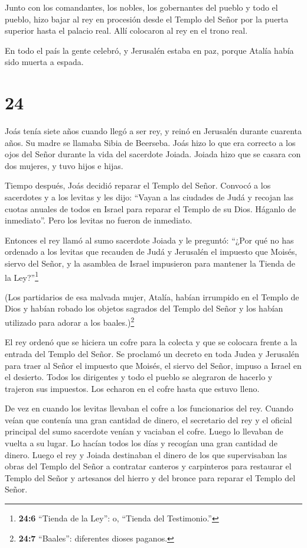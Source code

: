  Junto con los comandantes, los nobles, los gobernantes del
pueblo y todo el pueblo, hizo bajar al rey en procesión desde el Templo
del Señor por la puerta superior hasta el palacio real. Allí colocaron
al rey en el trono real.

 En todo el país la gente celebró, y Jerusalén estaba en
paz, porque Atalía había sido muerta a espada.

\hypertarget{section-23}{%
\section{24}\label{section-23}}

 Joás tenía siete años cuando llegó a ser rey, y reinó en
Jerusalén durante cuarenta años. Su madre se llamaba Sibia de Beerseba.
 Joás hizo lo que era correcto a los ojos del Señor durante
la vida del sacerdote Joiada.  Joiada hizo que se casara con
dos mujeres, y tuvo hijos e hijas.

 Tiempo después, Joás decidió reparar el Templo del Señor.
 Convocó a los sacerdotes y a los levitas y les dijo:
``Vayan a las ciudades de Judá y recojan las cuotas anuales de todos en
Israel para reparar el Templo de su Dios. Háganlo de inmediato''. Pero
los levitas no fueron de inmediato.

 Entonces el rey llamó al sumo sacerdote Joiada y le
preguntó: ``¿Por qué no has ordenado a los levitas que recauden de Judá
y Jerusalén el impuesto que Moisés, siervo del Señor, y la asamblea de
Israel impusieron para mantener la Tienda de la Ley?''\footnote{\textbf{24:6}
  ``Tienda de la Ley'': o, ``Tienda del Testimonio.''}

 (Los partidarios de esa malvada mujer, Atalía, habían
irrumpido en el Templo de Dios y habían robado los objetos sagrados del
Templo del Señor y los habían utilizado para adorar a los
baales.)\footnote{\textbf{24:7} ``Baales'': diferentes dioses paganos.}

 El rey ordenó que se hiciera un cofre para la colecta y que
se colocara frente a la entrada del Templo del Señor.  Se
proclamó un decreto en toda Judea y Jerusalén para traer al Señor el
impuesto que Moisés, el siervo del Señor, impuso a Israel en el
desierto.  Todos los dirigentes y todo el pueblo se
alegraron de hacerlo y trajeron sus impuestos. Los echaron en el cofre
hasta que estuvo lleno.

 De vez en cuando los levitas llevaban el cofre a los
funcionarios del rey. Cuando veían que contenía una gran cantidad de
dinero, el secretario del rey y el oficial principal del sumo sacerdote
venían y vaciaban el cofre. Luego lo llevaban de vuelta a su lugar. Lo
hacían todos los días y recogían una gran cantidad de dinero.
 Luego el rey y Joiada destinaban el dinero de los que
supervisaban las obras del Templo del Señor a contratar canteros y
carpinteros para restaurar el Templo del Señor y artesanos del hierro y
del bronce para reparar el Templo del Señor.

